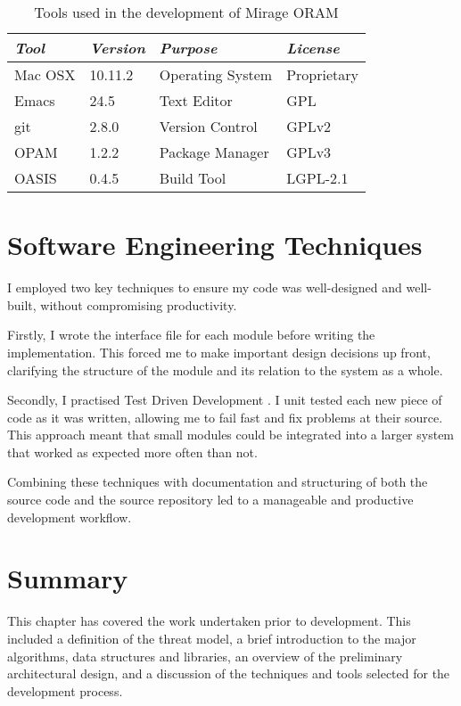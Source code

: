 \documentclass[12pt,a4paper,twoside,openright]{report}
\begin{document}
\begin{table}[t]
    \centering
    \begin{tabular}{|l|l|l|l|}
      \hline
      \textit{Tool} & \textit{Version} & \textit{Purpose} & \textit{License} \\
      \hline \hline
      Mac OSX & 10.11.2 & Operating System & Proprietary \\
      \hline
      Emacs & 24.5 & Text Editor & GPL \\
      \hline
      git & 2.8.0 & Version Control & GPLv2 \\
      \hline
      OPAM & 1.2.2 & Package Manager & GPLv3 \\
      \hline
      OASIS & 0.4.5 & Build Tool & LGPL-2.1 \\
      \hline
    \end{tabular}
    \caption{Tools used in the development of Mirage ORAM}
    \label{tab:devtools}
\end{table}

\section{Software Engineering Techniques}

I employed two key techniques to ensure my code was well-designed and well-built, without compromising productivity.

Firstly, I wrote the interface file for each module before writing the implementation. This forced me to make important design decisions up front, clarifying the structure of the module and its relation to the system as a whole.

Secondly, I practised Test Driven Development \cite{hunt2004pragmatic}. I unit tested each new piece of code as it was written, allowing me to fail fast and fix problems at their source. This approach meant that small modules could be integrated into a larger system that worked as expected more often than not.

Combining these techniques with documentation and structuring of both the source code and the source repository led to a manageable and productive development workflow.

\section{Summary}

This chapter has covered the work undertaken prior to development. This included a definition of the threat model, a brief introduction to the major algorithms, data structures and libraries, an overview of the preliminary architectural design, and a discussion of the techniques and tools selected for the development process.
\end{document}
